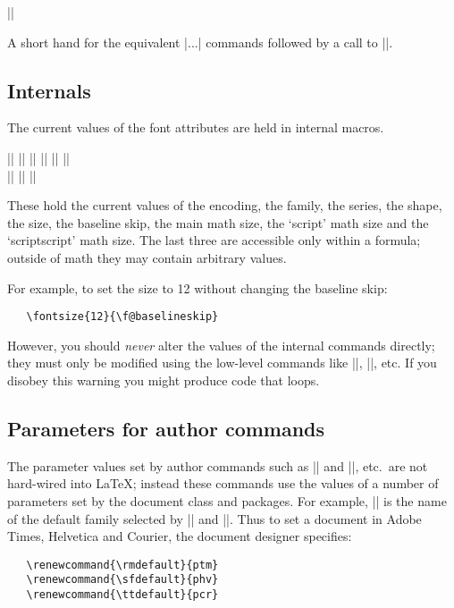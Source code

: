 \documentclass{ltxguide}[1995/11/28]
\begin{document}
\begin{decl}
  |\usefont|    
\end{decl}
A short hand for the equivalent |\font...| commands followed by a call
to |\selectfont|.

\subsection{Internals}

The current values of the font attributes are held in internal macros.

\begin{decl}
  |\f@encoding| \quad
  |\f@family| \quad
  |\f@series| \quad
  |\f@shape|  \quad
  |\f@size| \quad
  |\f@baselineskip| \\
  |\tf@size| \quad
  |\sf@size| \quad
  |\ssf@size|
\end{decl}

These hold the current values of the encoding, the family, the series,
the shape, the size, the baseline skip, the main math size, the `script'
math size and the `scriptscript' math size. The last three are
accessible only within a formula; outside of math they may contain
arbitrary values.

For example, to set the size to 12 without changing the baseline skip:
\begin{verbatim}
   \fontsize{12}{\f@baselineskip}
\end{verbatim}
However, you should \emph{never} alter the values of the internal
commands directly; they must only be modified using the low-level
commands like |\fontfamily|, |\fontseries|, etc. If you disobey this
warning you might produce code that loops.

\subsection{Parameters for author commands}
\label{sec:text.param}

The parameter values set by author commands such as |\textrm| and
|\rmfamily|, etc.\ are not hard-wired into \LaTeX; instead these
commands use the values of a number of parameters set by the document
class and packages.  For example, |\rmdefault| is the name of the
default family selected by |\textrm| and |\rmfamily|. Thus to set a
document in Adobe Times, Helvetica and Courier, the document designer
specifies:
\begin{verbatim}
   \renewcommand{\rmdefault}{ptm}
   \renewcommand{\sfdefault}{phv}
   \renewcommand{\ttdefault}{pcr}
\end{verbatim}
\end{document}
